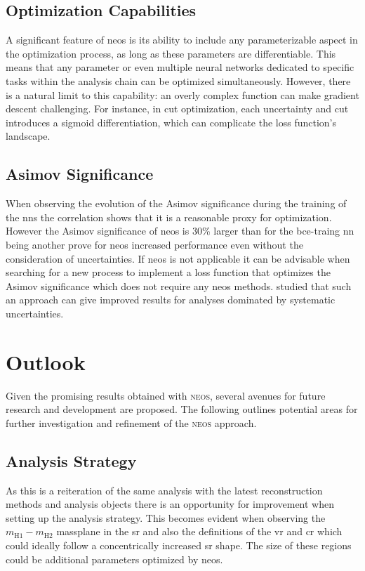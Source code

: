 \subsection{Optimization Capabilities}
A significant feature of \ac{neos} is its ability to include any parameterizable aspect in the optimization process, as long as these parameters are differentiable. This means that any parameter or even multiple neural networks dedicated to specific tasks within the analysis chain can be optimized simultaneously. However, there is a natural limit to this capability: an overly complex function can make gradient descent challenging. For instance, in cut optimization, each uncertainty and cut introduces a sigmoid differentiation, which can complicate the loss function's landscape.

\subsection{Asimov Significance}
When observing the evolution of the Asimov significance during the training of the \acp{nn} the correlation shows that it is a reasonable proxy for optimization. However the Asimov significance of \ac{neos} is 30\% larger than for the \ac{bce}-traing \ac{nn} being another prove for \ac{neos} increased performance even without the consideration of uncertainties. If \ac{neos} is not applicable it can be advisable when searching for a new process to implement a loss function that optimizes the Asimov significance which does not require any \ac{neos} methods. \citet{elwood2018direct} studied that such an approach can give improved results for analyses dominated by systematic uncertainties.


\section{Outlook}
Given the promising results obtained with \textsc{neos}, several avenues for future research and development are proposed. The following outlines potential areas for further investigation and refinement of the \textsc{neos} approach.

\subsection{Analysis Strategy}
As this is a reiteration of the same analysis with the latest reconstruction methods and analysis objects there is an opportunity for improvement when setting up the analysis strategy. This becomes evident when observing the $m_\text{H1}-m_\text{H2}$ massplane  in the \ac{sr} and also the definitions of the \ac{vr} and \ac{cr} which could ideally follow a concentrically increased \ac{sr} shape. The size of these regions could be additional parameters optimized by \ac{neos}.

